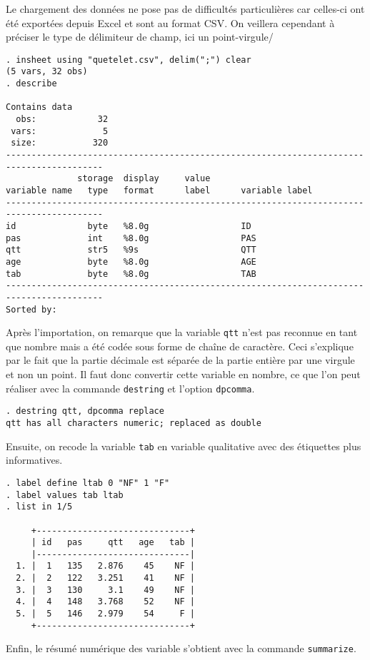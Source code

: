 \soln{\ref{exo:10.2}}
Le chargement des données ne pose pas de difficultés particulières car
celles-ci ont été exportées depuis Excel et sont au format CSV. On veillera
cependant à préciser le type de délimiteur de champ, ici un point-virgule/
\begin{verbatim}
. insheet using "quetelet.csv", delim(";") clear
(5 vars, 32 obs)
. describe

Contains data
  obs:            32                          
 vars:             5                          
 size:           320                          
-----------------------------------------------------------------------------------------
              storage  display     value
variable name   type   format      label      variable label
-----------------------------------------------------------------------------------------
id              byte   %8.0g                  ID
pas             int    %8.0g                  PAS
qtt             str5   %9s                    QTT
age             byte   %8.0g                  AGE
tab             byte   %8.0g                  TAB
-----------------------------------------------------------------------------------------
Sorted by:
\end{verbatim}
Après l'importation, on remarque que la variable \texttt{qtt} n'est pas
reconnue en tant que nombre mais a été codée sous forme de chaîne de
caractère. Ceci s'explique par le fait que la partie décimale est séparée de
la partie entière par une virgule et non un point. Il faut donc convertir cette
variable en nombre, ce que l'on peut réaliser avec la commande
\texttt{destring} et l'option \texttt{dpcomma}.
\begin{verbatim}
. destring qtt, dpcomma replace
qtt has all characters numeric; replaced as double
\end{verbatim}
Ensuite, on recode la variable \texttt{tab} en variable qualitative avec des
étiquettes plus informatives. 
\begin{verbatim}
. label define ltab 0 "NF" 1 "F"
. label values tab ltab
. list in 1/5

     +------------------------------+
     | id   pas     qtt   age   tab |
     |------------------------------|
  1. |  1   135   2.876    45    NF |
  2. |  2   122   3.251    41    NF |
  3. |  3   130     3.1    49    NF |
  4. |  4   148   3.768    52    NF |
  5. |  5   146   2.979    54     F |
     +------------------------------+
\end{verbatim}
Enfin, le résumé numérique des variable s'obtient avec la commande \texttt{summarize}.
